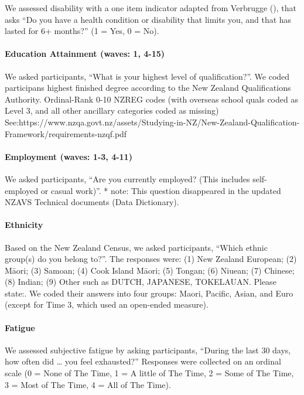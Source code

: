 \documentclass[
  singlecolumn]{article}
\let\oldparagraph\paragraph
\renewcommand{\paragraph}[1]{\oldparagraph{#1}\mbox{}}
\begin{document}
We assessed disability with a one item indicator adapted from Verbrugge
(), that asks ``Do you have a health
condition or disability that limits you, and that has lasted for 6+
months?'' (1 = Yes, 0 = No).

\paragraph{Education Attainment (waves: 1,
4-15)}\label{education-attainment-waves-1-4-15}

We asked participants, ``What is your highest level of qualification?''.
We coded participans highest finished degree according to the New
Zealand Qualifications Authority. Ordinal-Rank 0-10 NZREG codes (with
overseas school quals coded as Level 3, and all other ancillary
categories coded as missing)
See:https://www.nzqa.govt.nz/assets/Studying-in-NZ/New-Zealand-Qualification-Framework/requirements-nzqf.pdf

\paragraph{Employment (waves: 1-3,
4-11)}\label{employment-waves-1-3-4-11}

We asked participants, ``Are you currently employed? (This includes
self-employed or casual work)''. * note: This question disappeared in
the updated NZAVS Technical documents (Data Dictionary).

\paragraph{Ethnicity}\label{ethnicity}

Based on the New Zealand Census, we asked participants, ``Which ethnic
group(s) do you belong to?''. The responses were: (1) New Zealand
European; (2) Māori; (3) Samoan; (4) Cook Island Māori; (5) Tongan; (6)
Niuean; (7) Chinese; (8) Indian; (9) Other such as DUTCH, JAPANESE,
TOKELAUAN. Please state:. We coded their answers into four groups:
Maori, Pacific, Asian, and Euro (except for Time 3, which used an
open-ended measure).

\paragraph{Fatigue}\label{fatigue}

We assessed subjective fatigue by asking participants, ``During the last
30 days, how often did \ldots{} you feel exhausted?'' Responses were
collected on an ordinal scale (0 = None of The Time, 1 = A little of The
Time, 2 = Some of The Time, 3 = Most of The Time, 4 = All of The Time).
\end{document}
